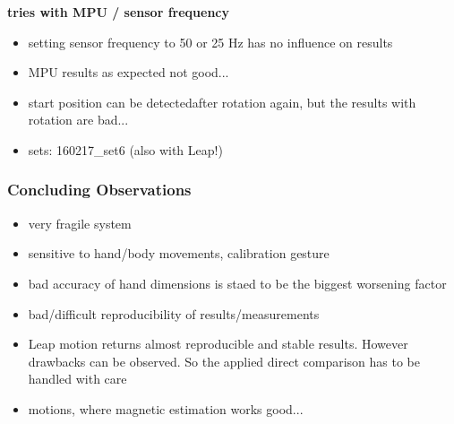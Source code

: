 %
\textbf{tries with MPU / sensor frequency}
	\begin{itemize}
	\item setting sensor frequency to 50 or 25 Hz has no influence on results
	\item MPU results as expected not good...
	\item start position can be \grqq detected\grqq after rotation again, but the results with rotation are bad...
	\item sets: 160217\_set6 (also with Leap!)
	\end{itemize}

%



\subsubsection{Concluding Observations}
	\begin{itemize}
	\item very fragile system
	\item sensitive to hand/body movements, calibration gesture
	\item bad accuracy of hand dimensions is staed to be the biggest worsening factor 
	\item bad/difficult reproducibility of results/measurements
	\item Leap motion returns almost reproducible and stable results. However drawbacks can be observed. So the applied direct comparison has to be handled with care
	\item motions, where magnetic estimation works good...
	\end{itemize}

